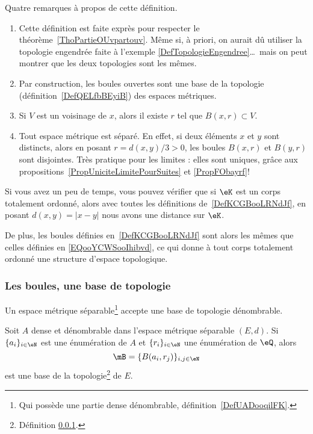 \begin{remark}  \label{RemQDRooKnwKk}
    Quatre remarques à propos de cette définition.
    \begin{enumerate}
    \item
      Cette définition est faite exprès pour respecter le théorème~\ref{ThoPartieOUvpartouv}. Même si, à priori, on aurait dû utiliser la topologie engendrée faite à l'exemple \ref{DefTopologieEngendree}\dots\ mais on peut montrer que les deux topologies sont les mêmes.
    \item      \label{ITEMooUIHJooXAFaIz}
      Par construction, les boules ouvertes sont une base de la topologie (définition~\ref{DefQELfbBEyiB}) des espaces métriques.
    \item       \label{ITEMooUIHJooXAFaJa}
      Si \( V\) est un voisinage de \( x\), alors il existe \( r\) tel que \( B(x,r)\subset V\).
    \item
      Tout espace métrique est séparé. En effet, si deux éléments \( x \) et \( y \) sont distincts, alors en posant \( r = d(x , y) / 3 > 0 \), les boules \( B(x,r) \) et \( B(y,r)\) sont disjointes. Très pratique pour les limites : elles sont uniques, grâce aux propositions~\ref{PropUniciteLimitePourSuites} et \ref{PropFObayrf}!
    \end{enumerate}
\end{remark}

\begin{normaltext}
    Si vous avez un peu de temps, vous pouvez vérifier que si \( \eK\) est un corps totalement ordonné, alors avec toutes les définitions de~\ref{DefKCGBooLRNdJf}, en posant \( d(x,y)=| x-y |\) nous avons une distance sur \( \eK\).

    De plus, les boules définies en~\ref{DefKCGBooLRNdJf} sont alors les mêmes que celles définies en \eqref{EQooYCWSooIhibvd}, ce qui donne à tout corps totalement ordonné une structure d'espace topologique.
\end{normaltext}

\subsubsection{Les boules, une base de topologie}

\begin{proposition} \label{PropNBSooraAFr}
    Un espace métrique séparable\footnote{Qui possède une partie dense dénombrable, définition~\ref{DefUADooqilFK}.} accepte une base de topologie dénombrable.

     Soit \( A\) dense et dénombrable dans l'espace métrique séparable \( (E,d)\). Si \( \{ a_i \}_{i\in \eN}\) est une énumération de \( A\) et \( \{ r_i \}_{i\in \eN}\) une énumération de \( \eQ\), alors
    \begin{equation}
        \mB=\{ B(a_i,r_j) \}_{i,j\in \eN}
    \end{equation}
    est une base de la topologie\footnote{Définition \ref{}.} de \( E\).
\end{proposition}

